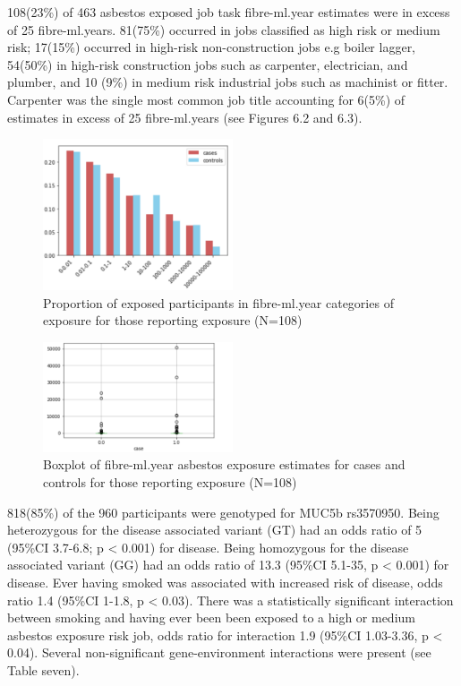 \documentclass[
]{article}
\begin{document}
108(23\%) of 463 asbestos exposed job task fibre-ml.year estimates were
in excess of 25 fibre-ml.years. 81(75\%) occurred in jobs classified as
high risk or medium risk; 17(15\%) occurred in high-risk
non-construction jobs e.g boiler lagger, 54(50\%) in high-risk
construction jobs such as carpenter, electrician, and plumber, and 10
(9\%) in medium risk industrial jobs such as machinist or fitter.
Carpenter was the single most common job title accounting for 6(5\%) of
estimates in excess of 25 fibre-ml.years (see Figures 6.2 and 6.3).

\begin{figure}
\centering
\includegraphics[width=0.5\textwidth,height=\textheight]{source/figures/fibre.png}
\caption{Proportion of exposed participants in fibre-ml.year categories
of exposure for those reporting exposure (N=108)}
\end{figure}

\begin{figure}
\centering
\includegraphics[width=0.5\textwidth,height=\textheight]{source/figures/fibre2.png}
\caption{Boxplot of fibre-ml.year asbestos exposure estimates for cases
and controls for those reporting exposure (N=108)}
\end{figure}

818(85\%) of the 960 participants were genotyped for MUC5b rs3570950.
Being heterozygous for the disease associated variant (GT) had an odds
ratio of 5 (95\%CI 3.7-6.8; p \textless{} 0.001) for disease. Being
homozygous for the disease associated variant (GG) had an odds ratio of
13.3 (95\%CI 5.1-35, p \textless{} 0.001) for disease. Ever having
smoked was associated with increased risk of disease, odds ratio 1.4
(95\%CI 1-1.8, p \textless{} 0.03). There was a statistically
significant interaction between smoking and having ever been been
exposed to a high or medium asbestos exposure risk job, odds ratio for
interaction 1.9 (95\%CI 1.03-3.36, p \textless{} 0.04). Several
non-significant gene-environment interactions were present (see Table
seven).
\end{document}
